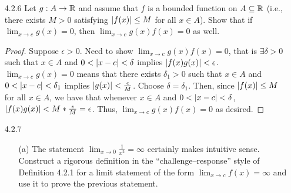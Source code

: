 \documentclass[12pt,letterpaper]{article}
\begin{document}
\begin{itemize}[leftmargin=!,labelindent=5pt]
\begin{itemize}
\begin{proof}
                            Now choose $\delta = \min{\{\delta_1, \delta_2, \delta_3\}}$.
                            Then, we have that
                                \begin{align*}
                                    \abs{(f(x)g(x)) - LM} &< \abs{f(x)}\frac{\epsilon}{2(\abs{L}+1)} + M\frac{\epsilon}{2M}\\
                                    &< (\abs{L}+1)\frac{\epsilon}{2(\abs{L}+1)} + M\frac{\epsilon}{2M}\\
                                    &= \frac{\epsilon}{2} + \frac{\epsilon}{2} = \epsilon
                                \end{align*}
                            whenever $x \in A$ and $0 < \abs{x - c} < \delta$ and $M \neq 0$.
                            So, $\lim_{x \to c} [f(x)g(x)] = LM$.
                        \end{proof}
            \end{itemize}
        \item [4.2.6] Let $g : A \to \mathbb{R}$ and assume that $f$ is a bounded function on $A \subseteq \mathbb{R}$ (i.e., there exists $M > 0$ satisfying $\abs{f(x)} \leq M$ for all $x \in A$). Show that if $\lim_{x \to c} g(x) = 0$, then $\lim_{x \to c} g(x)f(x) = 0$ as well.
            \begin{proof}
                Suppose $\epsilon > 0$.
                Need to show $\lim_{x \to c} g(x)f(x) = 0$, that is $\exists \delta > 0$ such that $x \in A$ and $0 < \abs{x-c} < \delta$ implies $\abs{f(x)g(x)} < \epsilon$.
                $\lim_{x \to c} g(x) = 0$ means that there exists $\delta_1>0$ such that $x \in A$ and $0 < \abs{x-c} < \delta_1$ implies $\abs{g(x)} < \frac{\epsilon}{M}$.
                Choose $\delta = \delta_1$.
                Then, since $\abs{f(x)} \leq M$ for all $x \in A$, we have that whenever $x \in A$ and $0 < \abs{x-c} < \delta$, $\abs{f(x)g(x)} < M *\frac{\epsilon}{M} = \epsilon$.
                Thus, $\lim_{x \to c} g(x)f(x) = 0$ as desired.
            \end{proof}
        \item [4.2.7] 
            \begin{itemize}
                \item [(a)] The statement $\lim_{x \to 0} \frac{1}{x^2} = \infty$ certainly makes intuitive sense. Construct a rigorous definition in the “challenge–response” style of Definition 4.2.1 for a limit statement of the form $\lim_{x \to c} f(x) = \infty$ and use it to prove the previous statement.


\end{itemize}
\end{itemize}
\end{document}
